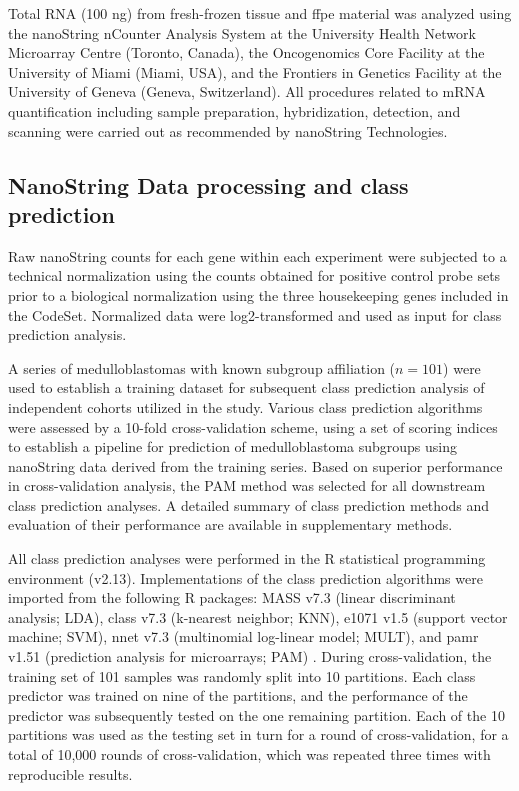 Total RNA (100 ng) from fresh-frozen tissue and \gls{ffpe} material was analyzed using the nanoString nCounter Analysis System at the University Health Network Microarray Centre (Toronto, Canada), the Oncogenomics Core Facility at the University of Miami (Miami, USA), and the Frontiers in Genetics Facility at the University of Geneva (Geneva, Switzerland).  All procedures related to mRNA quantification including sample preparation, hybridization, detection, and scanning were carried out as recommended by nanoString Technologies.

\subsection{NanoString Data processing and class prediction}

Raw nanoString counts for each gene within each experiment were subjected to a technical normalization using the counts obtained for positive control probe sets prior to a biological normalization using the three housekeeping genes included in the CodeSet.  Normalized data were log2-transformed and used as input for class prediction analysis.

A series of medulloblastomas with known subgroup affiliation ($n = 101$) were used to establish a training dataset for subsequent class prediction analysis of independent cohorts utilized in the study.  Various class prediction algorithms were assessed by a 10-fold cross-validation scheme, using a set of scoring indices to establish a pipeline for prediction of medulloblastoma subgroups using nanoString data derived from the training series.  Based on superior performance in cross-validation analysis, the PAM method was selected for all downstream class prediction analyses.  A detailed summary of class prediction methods and evaluation of their performance are available in supplementary methods.

All class prediction analyses were performed in the R statistical programming environment (v2.13). Implementations of the class prediction algorithms were imported
from the following R packages: MASS v7.3 (linear discriminant analysis; LDA), class v7.3 (k-nearest neighbor; KNN), e1071 v1.5 (support vector machine; SVM), nnet v7.3 (multinomial log-linear model; MULT), and pamr v1.51 (prediction analysis for microarrays; PAM) . During cross-validation, the training set of 101 samples was randomly split into 10 partitions. Each class predictor was trained on nine of the partitions, and the performance of the predictor was subsequently tested on the one remaining partition. Each of the 10 partitions was used as the testing set in turn for a round of cross-validation, for a total of 10,000 rounds of cross-validation, which was
repeated three times with reproducible results.

